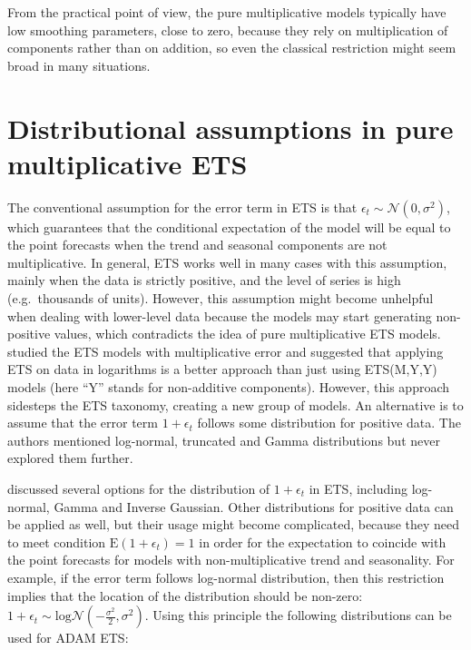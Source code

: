 \documentclass[
]{book}
\theoremstyle{definition}
\theoremstyle{definition}
\theoremstyle{definition}
\theoremstyle{definition}
\theoremstyle{remark}
\begin{document}
From the practical point of view, the pure multiplicative models typically have low smoothing parameters, close to zero, because they rely on multiplication of components rather than on addition, so even the classical restriction might seem broad in many situations.

\hypertarget{ADAMETSMultiplicativeDistributions}{%
\section{Distributional assumptions in pure multiplicative ETS}\label{ADAMETSMultiplicativeDistributions}}

The conventional assumption for the error term in ETS is that \(\epsilon_t\sim\mathcal{N}(0,\sigma^2)\), which guarantees that the conditional expectation of the model will be equal to the point forecasts when the trend and seasonal components are not multiplicative. In general, ETS works well in many cases with this assumption, mainly when the data is strictly positive, and the level of series is high (e.g.~thousands of units). However, this assumption might become unhelpful when dealing with lower-level data because the models may start generating non-positive values, which contradicts the idea of pure multiplicative ETS models. \citet{Akram2009} studied the ETS models with multiplicative error and suggested that applying ETS on data in logarithms is a better approach than just using ETS(M,Y,Y) models (here ``Y'' stands for non-additive components). However, this approach sidesteps the ETS taxonomy, creating a new group of models. An alternative \citep[also discussed in][]{Akram2009} is to assume that the error term \(1+\epsilon_t\) follows some distribution for positive data. The authors mentioned log-normal, truncated and Gamma distributions but never explored them further.

\citet{Svetunkov2020ETS} discussed several options for the distribution of \(1+\epsilon_t\) in ETS, including log-normal, Gamma and Inverse Gaussian. Other distributions for positive data can be applied as well, but their usage might become complicated, because they need to meet condition \(\mathrm{E}(1+\epsilon_t)=1\) in order for the expectation to coincide with the point forecasts for models with non-multiplicative trend and seasonality. For example, if the error term follows log-normal distribution, then this restriction implies that the location of the distribution should be non-zero: \(1+\epsilon_t\sim\mathrm{log}\mathcal{N}\left(-\frac{\sigma^2}{2},\sigma^2\right)\). Using this principle the following distributions can be used for ADAM ETS:
\end{document}
